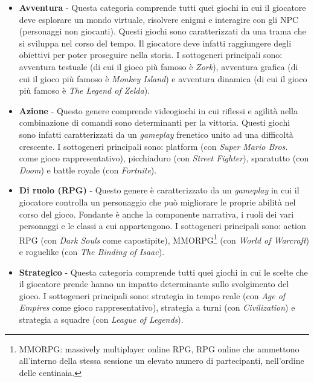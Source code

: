             \begin{itemize}
                \item \textbf{Avventura} - Questa categoria comprende tutti quei giochi in cui il giocatore deve esplorare un mondo virtuale, risolvere enigmi e interagire con gli NPC 
                    (personaggi non giocanti). Questi giochi sono caratterizzati da una trama che si sviluppa nel corso del tempo. Il giocatore deve infatti raggiungere degli obiettivi per 
                    poter proseguire nella storia. I sottogeneri principali sono: avventura testuale (di cui il gioco più famoso è \textit{Zork}), avventura grafica 
                    (di cui il gioco più famoso è \textit{Monkey Island}) e avventura dinamica (di cui il gioco più famoso è \textit{The Legend of Zelda}).
                \item \textbf{Azione} - Questo genere comprende videogiochi in cui riflessi e agilità nella combinazione di comandi sono determinanti per la vittoria. Questi giochi sono 
                    infatti caratterizzati da un \textit{gameplay} frenetico unito ad una difficoltà crescente. I sottogeneri principali sono: platform (con \textit{Super Mario Bros.} 
                    come gioco rappresentativo), picchiaduro (con \textit{Street Fighter}), sparatutto (con \textit{Doom}) e battle royale (con \textit{Fortnite}).
                \item \textbf{Di ruolo (RPG)} - Questo genere è caratterizzato da un \textit{gameplay} in cui il giocatore controlla un personaggio che può  
                    migliorare le proprie abilità nel corso del gioco. Fondante è anche la componente narrativa, i ruoli dei vari personaggi e le classi a cui appartengono. I sottogeneri
                    principali sono: action RPG (con \textit{Dark Souls} come capostipite), MMORPG\footnote{MMORPG: massively multiplayer online RPG, RPG online che ammettono
                    all'interno della stessa sessione un elevato numero di partecipanti, nell'ordine delle centinaia.} (con \textit{World of Warcraft}) e roguelike (con \textit{The
                    Binding of Isaac}).
                \item \textbf{Strategico} - Questa categoria comprende tutti quei giochi in cui le scelte che il giocatore prende hanno un impatto determinante sullo svolgimento del gioco.
                    I sottogeneri principali sono: strategia in tempo reale (con \textit{Age of Empires} come gioco rappresentativo), strategia a turni (con \textit{Civilization}) e 
                    strategia a squadre (con \textit{League of Legends}).
                \end{itemize}
        
